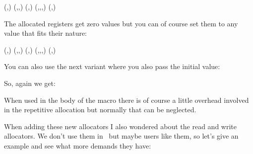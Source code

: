 \startbuffer
\begingroup
  \newlocaldimen\mydimena     {}\onepoint
  \newlocaldimen\mydimenb     {}\onepoint
  (\the\mydimena,\the\mydimenb)
  \begingroup
    \newlocaldimen\mydimena   {}\onepoint
    \newlocaldimen\mydimenb   {}\onepoint
    \newlocaldimen\mydimenc   {}\onepoint
    (\the\mydimena,\the\mydimenb,\the\mydimenc)
    \begingroup
      \newlocaldimen\mydimena {}\onepoint
      \newlocaldimen\mydimenb {}\onepoint
      (\the\mydimena,\the\mydimenb)
    \endgroup
    \newlocaldimen\mydimend   {}\onepoint
    (\the\mydimena,\the\mydimenb,\the\mydimenc,\the\mydimend)
  \endgroup
  (\the\mydimena,\the\mydimenb)
\endgroup
\stopbuffer

\typebuffer[option=TEX]

The allocated registers get zero values but you can of course set them to any
value that fits their nature:

\startlines \getbuffer \stoplines

\startbuffer
\begingroup
  \setnewlocaldimen{}\onepoint
  \setnewlocaldimen{}\onepoint
  (\the\mydimena,\the\mydimenb)
  \begingroup
    \setnewlocaldimen{}\onepoint
    \setnewlocaldimen{}\onepoint
    \setnewlocaldimen{}\onepoint
    (\the\mydimena,\the\mydimenb,\the\mydimenc)
    \begingroup
      \setnewlocaldimen{}\onepoint
      \setnewlocaldimen{}\onepoint
      (\the\mydimena,\the\mydimenb)
    \endgroup
    \setnewlocaldimen{}\onepoint
    (\the\mydimena,\the\mydimenb,\the\mydimenc,\the\mydimend)
  \endgroup
  (\the\mydimena,\the\mydimenb)
\endgroup
\stopbuffer

You can also use the next variant where you also pass the initial value:

\typebuffer[option=TEX]

So, again we get:

\startlines \getbuffer \stoplines

When used in the body of the macro there is of course a little overhead
involved in the repetitive allocation but normally that can be neglected.

\stopsection

\startsection[title=Files]

When adding these new allocators I also wondered about the read and write
allocators. We don't use them in \CONTEXT\ but maybe users like them, so let's
give an example and see what more demands they have:

